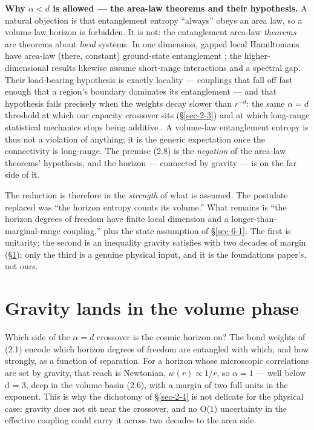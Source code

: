 \documentclass[12pt]{iopart}
\begin{document}
\textbf{Why \(\alpha  < d\) is allowed --- the area-law theorems and
their hypothesis.} A natural objection is that entanglement entropy
``always'' obeys an area law, so a volume-law horizon is forbidden. It
is not: the entanglement area-law \emph{theorems} are theorems about
\emph{local} systems. In one dimension, gapped local Hamiltonians have
area-law (there, constant) ground-state entanglement
\citep{Hastings:2007iok}; the higher-dimensional results
\citep{Brandao:2013fpa} likewise assume short-range interactions and a
spectral gap. Their load-bearing hypothesis is exactly locality ---
couplings that fall off fast enough that a region's boundary dominates
its entanglement --- and that hypothesis fails precisely when the
weights decay slower than \(r^{-d}\): the same \(\alpha  = d\) threshold
at which our capacity crossover sits (§\ref{sec-2-3}) and at which
long-range statistical mechanics stops being additive
\citep{Campa:2009jxa}. A volume-law entanglement entropy is thus not a
violation of anything; it is the generic expectation once the
connectivity is long-range. The premise (2.8) is the \emph{negation} of
the area-law theorems' hypothesis, and the horizon --- connected by
gravity --- is on the far side of it.

The reduction is therefore in the \emph{strength} of what is assumed.
The postulate replaced was ``the horizon entropy counts its volume.''
What remains is ``the horizon degrees of freedom have finite local
dimension and a longer-than-marginal-range coupling,'' plus the state
assumption of §\ref{sec-6-1}. The first is unitarity; the second is an
inequality gravity satisfies with two decades of margin (§\ref{sec-4});
only the third is a genuine physical input, and it is the foundations
paper's, not ours.

\section{Gravity lands in the volume phase}\label{sec-4}

Which side of the \(\alpha  = d\) crossover is the cosmic horizon on?
The bond weights of (2.1) encode which horizon degrees of freedom are
entangled with which, and how strongly, as a function of separation. For
a horizon whose microscopic correlations are set by gravity, that reach
is Newtonian, \(w(r) \propto  1/r\), so \(\alpha  = 1\) --- well below d
= 3, deep in the volume basin (2.6), with a margin of two full units in
the exponent. This is why the dichotomy of §\ref{sec-2-4} is not
delicate for the physical case: gravity does not sit near the crossover,
and no O(1) uncertainty in the effective coupling could carry it across
two decades to the area side.
\end{document}
